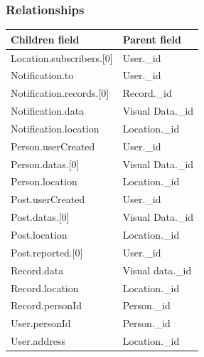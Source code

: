 \subsubsection{Relationships}
\begin{table}[H]
	\begin{tabular}{|l|l|}
		\hline
		\textbf{Children field}                             & \textbf{Parent field} \\ \hline
		Location.subscribers.{[}0{]}                        & User.\_id             \\ \hline
		Notification.to                                     & User.\_id             \\ \hline
		Notification.records.{[}0{]}                        & Record.\_id           \\ \hline
		Notification.data                                   & Visual Data.\_id      \\ \hline
		Notification.location                               & Location.\_id         \\ \hline
		Person.userCreated                                  & User.\_id             \\ \hline
		Person.datas.{[}0{]}                                & Visual Data.\_id      \\ \hline
		Person.location                                     & Location.\_id         \\ \hline
		Post.userCreated                                    & User.\_id             \\ \hline
		Post.datas.{[}0{]}                                  & Visual Data.\_id      \\ \hline
		Post.location                                       & Location.\_id         \\ \hline
		Post.reported.{[}0{]}                               & User.\_id             \\ \hline
		Record.data                                         & Visual data.\_id      \\ \hline
		Record.location                                     & Location.\_id         \\ \hline
		Record.personId                                     & Person.\_id           \\ \hline
		User.personId                                       & Person.\_id           \\ \hline
		User.address                                        & Location.\_id         \\ \hline

\end{tabular}
\end{table}
